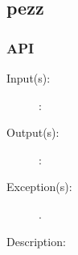 %
%
%
%
%              

\subsection{pezz}
\label{pezz}

\subsubsection{API}
\begin{description}
\label{pezz_}
\item[{\cfunc[]{pezz\_}{}}: ]
	\begin{description}\item[]
	\item[Input(s): ]
		\begin{description}\item[]
		\item[: ]
		\end{description}
	\item[Output(s): ]
		\begin{description}\item[]
		\item[: ]
		\end{description}
	\item[Exception(s): ]
		\begin{description}\item[]
		\item[.]
		\end{description}
	\item[Description: ]
	\end{description}
\end{description}
